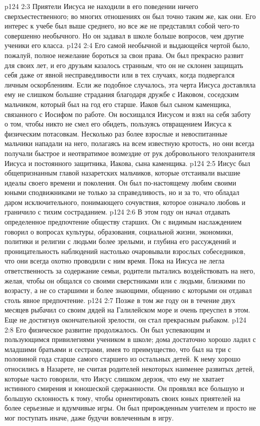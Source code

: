 \vs p124 2:3 Приятели Иисуса не находили в его поведении ничего сверхъестественного; во многих отношениях он был точно таким же, как они. Его интерес к учебе был выше среднего, но все же не представлял собой чего\hyp{}то совершенно необычного. Но он задавал в школе больше вопросов, чем другие ученики его класса.
\vs p124 2:4 \pc Его самой необычной и выдающейся чертой было, пожалуй, полное нежелание бороться за свои права. Он был прекрасно развит для своих лет, и его друзьям казалось странным, что он не склонен защищать себя даже от явной несправедливости или в тех случаях, когда подвергался личным оскорблениям. Если же подобное случалось, эта черта Иисуса доставляла ему не слишком большие страдания благодаря дружбе с Иаковом, соседским мальчиком, который был на год его старше. Иаков был сыном каменщика, связанного с Иосифом по работе. Он восхищался Иисусом и взял на себя заботу о том, чтобы никто не смел его обидеть, пользуясь отвращением Иисуса к физическим потасовкам. Несколько раз более взрослые и невоспитанные мальчики нападали на него, полагаясь на всем известную кротость, но они всегда получали быстрое и неотвратимое возмездие от рук добровольного телохранителя Иисуса и постоянного защитника, Иакова, сына каменщика.
\vs p124 2:5 Иисус был общепризнанным главой назаретских мальчиков, которые отстаивали высшие идеалы своего времени и поколения. Он был по\hyp{}настоящему любим своими юными сподвижниками не только за справедливость, но и за то, что обладал даром исключительного, понимающего сочувствия, которое означало любовь и граничило с тихим состраданием.
\vs p124 2:6 В этом году он начал отдавать определенное предпочтение обществу старших. Он с видимым наслаждением говорил о вопросах культуры, образования, социальной жизни, экономики, политики и религии с людьми более зрелыми, и глубина его рассуждений и проницательность наблюдений настолько очаровывали взрослых собеседников, что они всегда охотно проводили с ним время. Пока на Иисуса не легла ответственность за содержание семьи, родители пытались воздействовать на него, желая, чтобы он общался со своими сверстниками или с людьми, близкими по возрасту, а не со старшими и более знающими, общению с которыми он отдавал столь явное предпочтение.
\vs p124 2:7 Позже в том же году он в течение двух месяцев рыбачил со своим дядей на Галилейском море и очень преуспел в этом. Еще не достигнув окончательной зрелости, он стал прекрасным рыбаком.
\vs p124 2:8 Его физическое развитие продолжалось. Он был успевающим и пользующимся привилегиями учеником в школе; дома достаточно хорошо ладил с младшими братьями и сестрами, имея то преимущество, что был на три с половиной года старше самого старшего из остальных детей. К нему хорошо относились в Назарете, не считая родителей некоторых наименее развитых детей, которые часто говорили, что Иисус слишком дерзок, что ему не хватает истинного смирения и юношеской сдержанности. Он проявлял все большую и большую склонность к тому, чтобы ориентировать своих юных приятелей на более серьезные и вдумчивые игры. Он был прирожденным учителем и просто не мог поступать иначе, даже будучи вовлеченным в игру.
